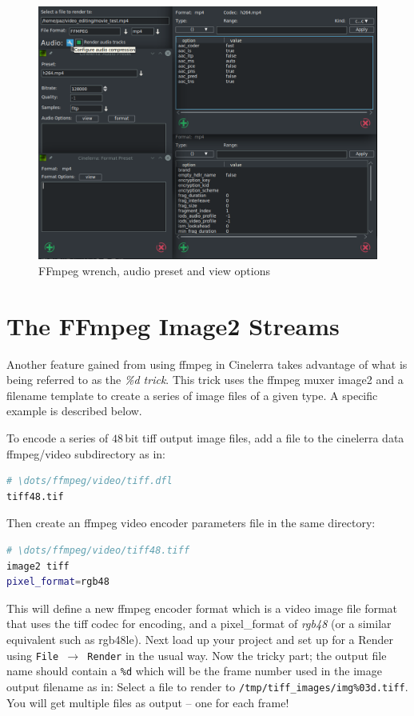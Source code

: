 \begin{figure}[htpb]
    \centering
    \includegraphics[width=0.8\linewidth]{images/audio-preset02.png}
    \caption{FFmpeg wrench, audio preset and view options}
    \label{fig:audio-preset02}
\end{figure}

\section{The FFmpeg Image2 Streams}%
\label{sec:ffmpeg_image2_streams}

Another feature gained from using ffmpeg in Cinelerra takes advantage of what is being referred to as the \textit{\%d trick}.  This trick uses the ffmpeg muxer image2 and a filename template to create a series of image files of a given type.  A specific example is described below.

To encode a series of $48$\,bit tiff output image files, add a file to the cinelerra data ffmpeg/video subdirectory as in:

\begin{lstlisting}[language=bash,numbers=none]
# \dots/ffmpeg/video/tiff.dfl
tiff48.tif
\end{lstlisting}

Then create an ffmpeg video encoder parameters file in the same directory:

\begin{lstlisting}[language=bash,numbers=none]
# \dots/ffmpeg/video/tiff48.tiff
image2 tiff
pixel_format=rgb48
\end{lstlisting}

This will define a new ffmpeg encoder format which is a video image file format that uses the tiff codec for encoding, and a pixel\_format of \textit{rgb48} (or a similar equivalent such as rgb48le).  Next load up your project and set up for a Render using \texttt{File $\rightarrow$ Render} in the usual way.  Now the tricky part; the output file name should contain a \texttt{\%d} which will be the frame number used in the image output filename as in:  Select a file to render to  \texttt{/tmp/tiff\_images/img\%03d.tiff}.  You will get multiple files as output -- one for each frame!

